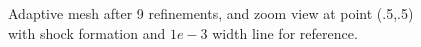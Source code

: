 \begin{figure}[!h]
\centering
{}
\caption{Adaptive mesh after 9 refinements, and zoom view at point (.5,.5) with shock formation and $1e-3$ width line for reference.}
\label{fig:BurgersShockZoom}
\end{figure}
